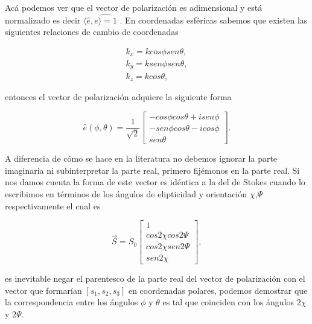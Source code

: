         Acá podemos ver que el vector de polarización es adimensional y está normalizado es decir $\langle \hat{e},\hat{e \rangle = 1}$ . En coordenadas esféricas sabemos que existen las siguientes relaciones de cambio de coordenadas

        \begin{align}
            k_x = kcos\phi sen\theta,\\
            k_y = ksen\phi sen\theta,\\
            k_z = kcos\theta,
        \end{align}

        entonces el vector de polarización adquiere la siguiente forma

        \begin{equation}
            \hat{e}(\phi,\theta) = \frac{1}{\sqrt{2}}
            \begin{bmatrix}
                -cos\phi cos\theta + isen\phi \\
                -sen\phi cos\theta - icos\phi \\
                sen\theta
            \end{bmatrix}.
        \end{equation}

        A diferencia de cómo se hace en la literatura no debemos ignorar la parte imaginaria ni subinterpretar la parte real, primero fijémonos en la parte real. Si nos damos cuenta la forma de este vector es idéntica a la del de Stokes cuando lo escribimos en términos de los ángulos de elipticidad y orientación $\chi$,$\Psi$ respectivamente el cual es \cite{goldstein2017polarized}

        \begin{equation}
            \Vec{S} = S_0 
            \begin{bmatrix}
                1\\
                cos2\chi cos2\Psi\\
                cos2\chi sen2\Psi \\
                sen2\chi
            \end{bmatrix},
        \end{equation}

        es inevitable negar el parentesco de la parte real del vector de polarización con el vector que formarían $[s_1,s_2,s_3]$ en coordenadas polares, podemos demostrar que la correspondencia entre los ángulos $\phi$ y $\theta$ es tal que coinciden con los ángulos $2\chi$ y $2\Psi$. \\

